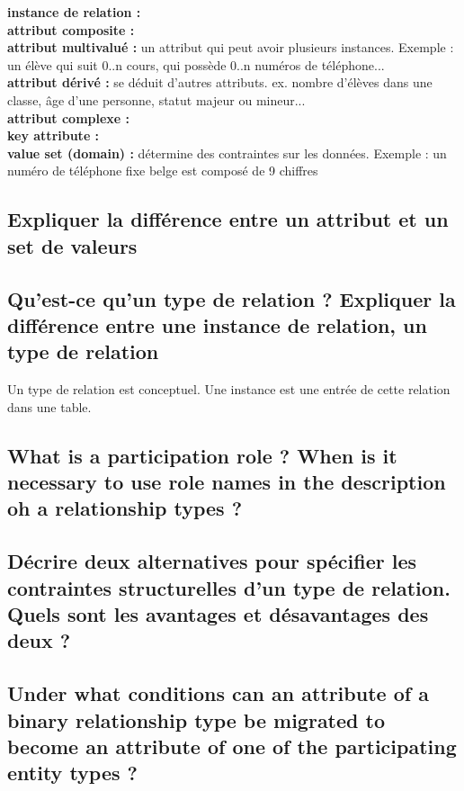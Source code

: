 \textbf{instance de relation :}\\

\textbf{attribut composite :} \\

\textbf{attribut multivalué :} un attribut qui peut avoir plusieurs instances. 
Exemple : un élève qui suit 0..n cours, qui possède 0..n numéros de téléphone...\\

\textbf{attribut dérivé :} se déduit d'autres attributs. ex. nombre d'élèves dans une classe, âge d'une personne, statut majeur ou mineur...\\
\textbf{attribut complexe :} \\
\textbf{key attribute :} \\
\textbf{value set (domain) :} détermine des contraintes sur les données. Exemple : un numéro de téléphone fixe belge est composé de 9 chiffres\\

\subsection{Expliquer la différence entre un attribut et un set de valeurs}

\subsection{Qu'est-ce qu'un type de relation ? Expliquer la différence entre une instance de relation, un type de relation}
Un type de relation est conceptuel. Une instance est une entrée de cette relation dans une table.

\subsection{What is a participation role ? When is it necessary to use role names in the description oh a relationship types ?}

\subsection{Décrire deux alternatives pour spécifier les contraintes structurelles d'un type de relation. Quels sont les avantages et désavantages des deux ?}

\subsection{Under what conditions can an attribute of a binary relationship type be migrated to become an attribute of one of the participating entity types ?}

